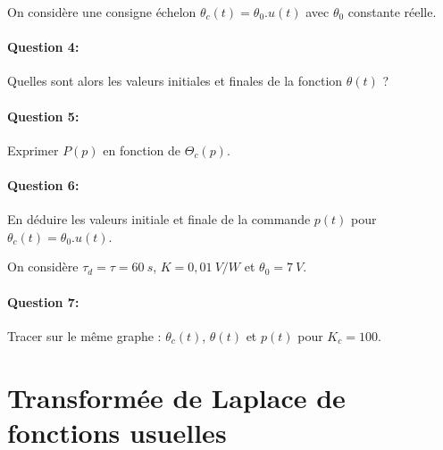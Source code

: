 On considère une consigne échelon $\theta_c(t)=\theta_0.u(t)$ avec $\theta_0$ constante réelle. 

\paragraph{Question 4:} Quelles sont alors les valeurs initiales et finales de la fonction $\theta(t)$ ?

\paragraph{Question 5:} Exprimer $P(p)$ en fonction de $\Theta_c(p)$.

\paragraph{Question 6:} En déduire les valeurs initiale et finale de la commande $p(t)$ pour $\theta_c(t)=\theta_0.u(t)$.

On considère $\tau_d=\tau=60\ s$, $K=0,01\ V/W$ et $\theta_0=7\ V$.

\paragraph{Question 7:} Tracer sur le même graphe : $\theta_c(t)$, $\theta(t)$ et $p(t)$ pour $K_c=100$.

\section{Transformée de Laplace de fonctions usuelles}


